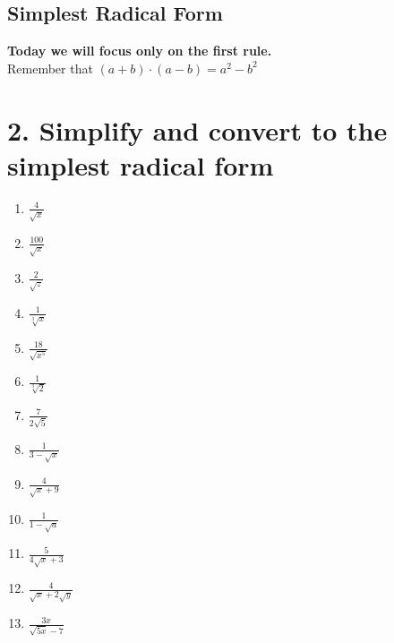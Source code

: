 \documentclass{hw}
\begin{document}
\subsection*{\normalsize Simplest Radical Form}
\begin{center}
\end{center}

\textbf{Today we will focus only on the first rule.} \\


Remember that $(a+b)\cdot(a-b) = a^2 - b^2$ \\

\section*{\normalsize 2. Simplify and convert to the simplest radical form}
\begin{enumerate}[label=\alph*.]
    \item $\frac{4}{\sqrt{x}}$
    \studentxlargeworkspace
    \item $\frac{100}{\sqrt{x}}$
    \studentxlargeworkspace
    \item $\frac{2}{\sqrt{z}}$
    \studentxlargeworkspace
    \item $\frac{1}{\sqrt[3]{x}}$
    \studentxlargeworkspace
    \item $\frac{18}{\sqrt{x^5}}$
    \studentxlargeworkspace
    \item $\frac{1}{\sqrt[3]{2}}$
    \studentxlargeworkspace
    \item $\frac{7}{2\sqrt{5}}$
    \studentxlargeworkspace
    \item $\frac{1}{3 - \sqrt{x}}$
    \studentxlargeworkspace
    \item $\frac{4}{\sqrt{x} + 9}$
    \studentxlargeworkspace
    \item $\frac{1}{1-\sqrt{a}}$
    \studentxlargeworkspace
    \item $\frac{5}{4\sqrt{x} + 3}$
    \studentxxlargeworkspace
    \item $\frac{4}{\sqrt{x} + 2\sqrt{y}}$
    \studentxxlargeworkspace
    \item $\frac{3x}{\sqrt{5x} -7}$
    \studentxxlargeworkspace
\end{enumerate}
\end{document}
